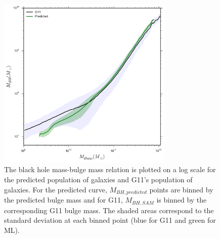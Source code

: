 \documentclass[a4paper,fleqn,usenatbib]{mnras}
\begin{document}
\begin{figure}
  \includegraphics[width=84mm]{fig10.pdf}
  \caption{The black hole mass-bulge mass relation is plotted on a log scale for the predicted population of galaxies and G11's population of galaxies. For the predicted curve, $M_{BH,predicted}$ points are binned by the predicted bulge mass and for G11, $M_{BH,SAM}$ is binned by the corresponding G11 bulge mass. The shaded areas correspond to the standard deviation at each binned point (blue for G11 and green for ML).}
    \label{bhbulge}

\end{figure}
\end{document}

